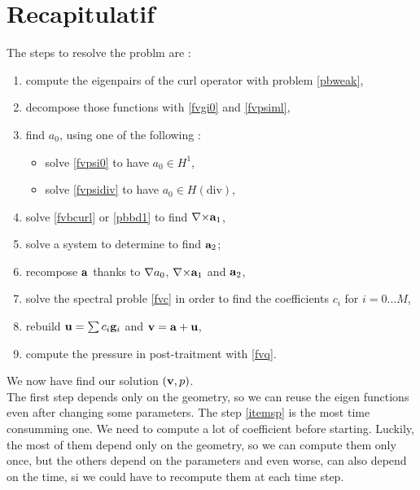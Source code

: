 







\chapter{Recapitulatif}

The steps to resolve the problm are :
\begin{enumerate}
\item compute the eigenpairs of the curl operator with problem \ref{pbweak},
\item decompose those functions with \ref{fvgi0} and \ref{fvpsiml},
\item find $a_0$, using one of the following :
  \begin{itemize}
  \item solve \ref{fvpsi0} to have $a_0\in H^1$,
  \item solve \ref{fvpsidiv} to have $a_0\in H(\mathrm{div})$,
  \end{itemize}
\item solve \ref{fvbcurl} or \ref{pbbd1} to find ${\nabla\times}{\mathbf{a}}_1$,
\item solve a system to determine to find ${\mathbf{a}}_2$;
\item recompose ${\mathbf{a}}$ thanks to ${\nabla} a_0$, ${\nabla\times}{\mathbf{a}}_1$ and ${\mathbf{a}}_2$,
\item \label{itemsp} solve the spectral proble \ref{fvc} in order to find the coefficients $c_i$ for $i=0\dots M$,
\item rebuild ${\mathbf{u}}=\sum c_i {\mathbf{g}}_i$ and ${\mathbf{v}}={\mathbf{a}}+{\mathbf{u}}$,
\item compute the pressure in post-traitment with \ref{fvq}.
\end{enumerate}

We now have find our solution $({\mathbf{v}},p)$.\\
The first step depends only on the geometry, so we can reuse the eigen functions even after changing some parameters. The step \ref{itemsp} is the most time consumming one. We need to compute a lot of coefficient before starting. Luckily, the most of them depend only on the geometry, so we can compute them only once, but the others depend on the parameters and even worse, can also depend on the time, si we could have to recompute them at each time step.\\

